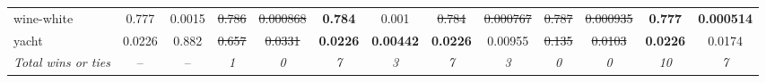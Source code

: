 \begin{tabular}{l|cc|cc|cc|cc|cc|cc}
wine-white & 0.777 & 0.0015 & \sout{0.786} & \sout{0.000868} & \textbf{0.784} & 0.001 & \sout{0.784} & \sout{0.000767} & \sout{0.787} & \sout{0.000935} & \textbf{0.777} & \textbf{0.000514} \\
yacht & 0.0226 & 0.882 & \sout{0.657} & \sout{0.0331} & \textbf{0.0226} & \textbf{0.00442} & \textbf{0.0226} & 0.00955 & \sout{0.135} & \sout{0.0103} & \textbf{0.0226} & 0.0174 \\
\textit{{Total wins or ties}} & -- & -- & \textit{1} & \textit{0} & \textit{7} & \textit{3} & \textit{7} & \textit{3} & \textit{0} & \textit{0} & \textit{10} & \textit{7} \\
\bottomrule
\end{tabular}
